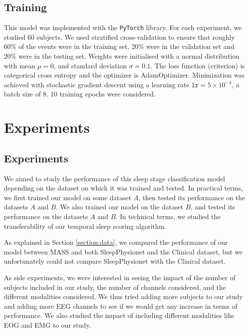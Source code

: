 \documentclass[titlepage, 11pt, a4paper, fancysections]{article}
\begin{document}
\subsection{Training}

This model was implemented with the \texttt{PyTorch} library. For each experiment, we studied 60 subjects. We used stratified cross-validation to ensure that roughly 60\% of the events were in the training set, 20\% were in the validation set and 20\% were in the testing set. Weights were initialised with a normal distribution with mean $\mu = 0$, and standard deviation $\sigma = 0.1$. The loss function (criterion) is categorical cross entropy and the optimizer is AdamOptimizer. Minimization was achieved with stochastic gradient descent using a learning rate $\texttt{lr} = 5\times10^{-4}$, a batch size of 8. 10 training epochs were considered. 

\newpage
\section{Experiments}
\label{section:exp}

\subsection{Experiments}

We aimed to study the performance of this sleep stage classification model depending on the dataset on which it was trained and tested. In practical terms, we first trained our model on some dataset $A$, then tested its performance on the datasets $A$ and $B$. We also trained our model on the dataset $B$, and tested its performance on the datasets $A$ and $B$. In technical terms, we studied the transferability of our temporal sleep scoring algorithm. 

As explained in Section \ref{section:data}, we compared the performance of our model between MASS and both SleepPhysionet and the Clinical dataset, but we unfortunately could not compare SleepPhysionet with the Clinical dataset.

As side experiments, we were interested in seeing the impact of the number of subjects included in our study, the number of channels considered, and the different modalities considered. We thus tried adding more subjects to our study and adding more EEG channels to see if we would get any increase in terms of performance. We also studied the impact of including different modalities like EOG and EMG to our study. 
\end{document}
